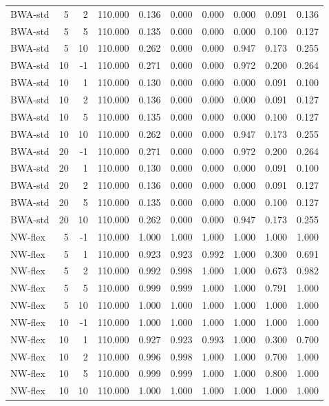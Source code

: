 \begin{table}
\begin{tabular}{lrrrrrrrrr}
BWA-std & 5 & 2 & 110.000 & 0.136 & 0.000 & 0.000 & 0.000 & 0.091 & 0.136 \\
BWA-std & 5 & 5 & 110.000 & 0.135 & 0.000 & 0.000 & 0.000 & 0.100 & 0.127 \\
BWA-std & 5 & 10 & 110.000 & 0.262 & 0.000 & 0.000 & 0.947 & 0.173 & 0.255 \\
BWA-std & 10 & -1 & 110.000 & 0.271 & 0.000 & 0.000 & 0.972 & 0.200 & 0.264 \\
BWA-std & 10 & 1 & 110.000 & 0.130 & 0.000 & 0.000 & 0.000 & 0.091 & 0.100 \\
BWA-std & 10 & 2 & 110.000 & 0.136 & 0.000 & 0.000 & 0.000 & 0.091 & 0.127 \\
BWA-std & 10 & 5 & 110.000 & 0.135 & 0.000 & 0.000 & 0.000 & 0.100 & 0.127 \\
BWA-std & 10 & 10 & 110.000 & 0.262 & 0.000 & 0.000 & 0.947 & 0.173 & 0.255 \\
BWA-std & 20 & -1 & 110.000 & 0.271 & 0.000 & 0.000 & 0.972 & 0.200 & 0.264 \\
BWA-std & 20 & 1 & 110.000 & 0.130 & 0.000 & 0.000 & 0.000 & 0.091 & 0.100 \\
BWA-std & 20 & 2 & 110.000 & 0.136 & 0.000 & 0.000 & 0.000 & 0.091 & 0.127 \\
BWA-std & 20 & 5 & 110.000 & 0.135 & 0.000 & 0.000 & 0.000 & 0.100 & 0.127 \\
BWA-std & 20 & 10 & 110.000 & 0.262 & 0.000 & 0.000 & 0.947 & 0.173 & 0.255 \\
NW-flex & 5 & -1 & 110.000 & 1.000 & 1.000 & 1.000 & 1.000 & 1.000 & 1.000 \\
NW-flex & 5 & 1 & 110.000 & 0.923 & 0.923 & 0.992 & 1.000 & 0.300 & 0.691 \\
NW-flex & 5 & 2 & 110.000 & 0.992 & 0.998 & 1.000 & 1.000 & 0.673 & 0.982 \\
NW-flex & 5 & 5 & 110.000 & 0.999 & 0.999 & 1.000 & 1.000 & 0.791 & 1.000 \\
NW-flex & 5 & 10 & 110.000 & 1.000 & 1.000 & 1.000 & 1.000 & 1.000 & 1.000 \\
NW-flex & 10 & -1 & 110.000 & 1.000 & 1.000 & 1.000 & 1.000 & 1.000 & 1.000 \\
NW-flex & 10 & 1 & 110.000 & 0.927 & 0.923 & 0.993 & 1.000 & 0.300 & 0.700 \\
NW-flex & 10 & 2 & 110.000 & 0.996 & 0.998 & 1.000 & 1.000 & 0.700 & 1.000 \\
NW-flex & 10 & 5 & 110.000 & 0.999 & 0.999 & 1.000 & 1.000 & 0.800 & 1.000 \\
NW-flex & 10 & 10 & 110.000 & 1.000 & 1.000 & 1.000 & 1.000 & 1.000 & 1.000 \\

\end{tabular}
\end{table}
